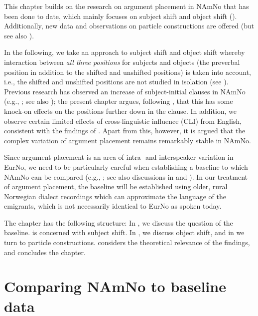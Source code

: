 \documentclass[output=paper]{langscibook}
\begin{document}
This chapter builds on the research on argument placement in NAmNo that has been done to date, which mainly focuses on subject shift and object shift (\citealt{AnderssenWestergaard2020, LarssonKinn2021, LarssonForthcoming}). Additionally, new data and observations on particle constructions are offered (but see also \citealt{LarssonKinn2021}).

In the following, we take an approach to subject shift and object shift whereby interaction between \textit{all three positions} for subjects and objects (the preverbal position in addition to the shifted and unshifted positions) is taken into account, i.e., the shifted and unshifted positions are not studied in isolation (see \citealt{Andréasson2010, LindahlEngdahl2022}). Previous research has observed an increase of subject-initial clauses in NAmNo (e.g., \citealt{WestergaardEtAl2021}; see also ); the present chapter argues, following \textcite{LarssonKinn2021, LarssonForthcoming}, that this has some knock-on effects on the positions further down in the clause. In addition, we observe certain limited effects of cross-linguistic influence (CLI) from English, consistent with the findings of \citet{AnderssenWestergaard2020}. Apart from this, however, it is argued that the complex variation of argument placement remains remarkably stable in NAmNo. 

Since argument placement is an area of intra- and interspeaker variation in EurNo, we need to be particularly careful when establishing a baseline to which NAmNo can be compared (e.g., \citealt{Polinsky2018}; see also discussions in  and ). In our treatment of argument placement, the baseline will be established using older, rural Norwegian dialect recordings which can approximate the language of the emigrants, which is not necessarily identical to EurNo as spoken today.\textsuperscript{} 

The chapter has the following structure: In , we discuss the question of the baseline.  is concerned with subject shift. In , we discuss object shift, and in  we turn to particle constructions.  considers the theoretical relevance of the findings, and  concludes the chapter. 

\section{Comparing NAmNo to baseline data}\label{sec:larsson:2}
\end{document}
